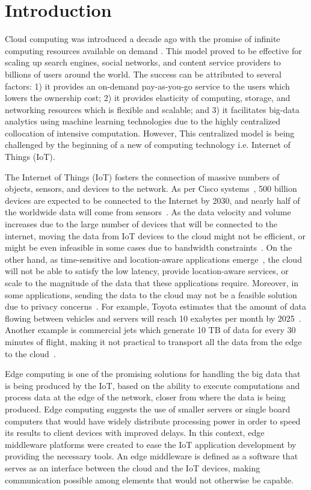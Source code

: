 \section{Introduction}
Cloud computing was introduced a decade ago with the promise of infinite computing resources available on demand \cite{Armbrust09abovethe}. This model proved to be effective for scaling up search engines\cite{7073834}, social networks\cite{6596496}, and content service providers\cite{6915771} to billions of users around the world. The success can be attributed to several factors: 1) it provides an on-demand pay-as-you-go service to the users which lowers the ownership cost; 2) it provides elasticity of computing, storage, and networking resources which is flexible and scalable; and 3) it facilitates big-data analytics using machine learning technologies due to the highly centralized collocation of intensive computation. However, This centralized model is being challenged by the beginning of a new of computing technology i.e. Internet of Things (IoT).

The Internet of Things (IoT) fosters the connection of massive numbers of objects, sensors, and devices to the network. As per Cisco systems~\cite{ciscoGlance}, 500 billion devices are expected to be connected to the Internet by 2030, and nearly half of the worldwide data will come from sensors~\cite{McAuley}. As the data velocity and volume increases due to the large number of devices that will be connected to the internet, moving the data from IoT devices to the cloud might not be efficient, or might be even infeasible in some cases due to bandwidth constraints~\cite{8289317}. On the other hand, as time-sensitive and location-aware applications emerge~\cite{7389122}, the cloud will not be able to satisfy the low latency, provide location-aware services, or scale to the magnitude of the data that these applications require. Moreover, in some applications, sending the data to the cloud may not be a feasible solution due to privacy concerns~\cite{7849185}. For example, Toyota estimates that the amount of data flowing between vehicles and servers will reach 10 exabytes per month by 2025~\cite{Toyota}. Another example is commercial jets which generate 10 TB of data for every 30 minutes of flight, making it not practical to transport all the data from the edge to the cloud~\cite{ciscoJet}. 

Edge computing is one of the promising solutions for handling the big data that is being produced by the IoT, based on the ability to execute computations and process data at the edge of the network, closer from where the data is being produced. Edge computing suggests the use of smaller servers or single board computers that would have widely distribute processing power in order to speed its results to client devices with improved delays. In this context, edge middleware platforms were created to ease the IoT application development by providing the necessary tools. An edge middleware is defined as a software that serves as an interface between the cloud and the IoT devices, making communication possible among elements that would not otherwise be capable. 

